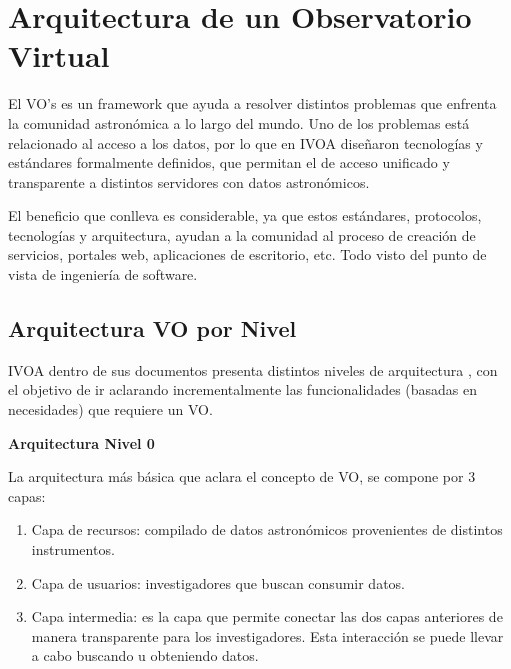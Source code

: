 \section{Arquitectura de un Observatorio Virtual}

El VO's es un framework que ayuda a resolver distintos
problemas que enfrenta la comunidad astronómica a lo largo del mundo.  Uno de
los problemas está relacionado al acceso a los datos, por lo que en IVOA
diseñaron tecnologías y estándares formalmente definidos, que permitan el de
acceso unificado y transparente a distintos servidores con datos astronómicos.

El beneficio que conlleva es considerable, ya que estos
estándares, protocolos, tecnologías y arquitectura, ayudan a la comunidad al
proceso de creación de servicios, portales web, aplicaciones de escritorio,
etc. Todo visto del punto de vista de ingeniería de software.

\subsection{Arquitectura VO por Nivel}

IVOA dentro de sus documentos presenta distintos niveles de arquitectura
\cite{ivoa_arch}, con el objetivo de ir aclarando incrementalmente las
funcionalidades (basadas en necesidades) que requiere un VO.

\textbf{Arquitectura Nivel 0} %


La arquitectura más básica que aclara el concepto de VO, se compone por 3
capas:

\begin{enumerate}
    \item Capa de recursos:
          compilado de datos astronómicos provenientes de distintos instrumentos.
    \item Capa de usuarios:
          investigadores que buscan consumir datos.
    \item Capa intermedia:
          es la capa que permite conectar las dos
          capas anteriores de manera transparente para los investigadores.
          Esta interacción se puede llevar a cabo buscando u obteniendo datos.
\end{enumerate}

